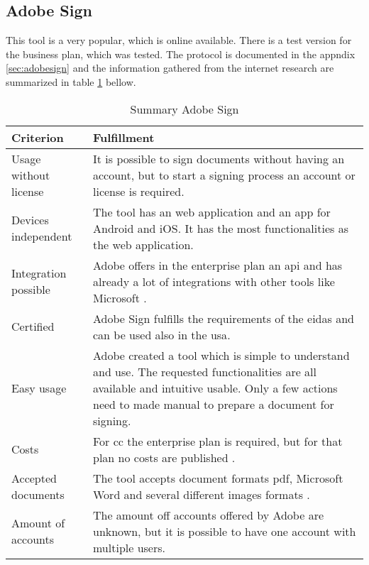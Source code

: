 \subsection{Adobe Sign}
This tool is a very popular, which is online available. There is a test version for the business plan, which was tested. The protocol is documented in the appndix \ref{sec:adobesign} and the information gathered from the internet research are summarized in table \ref{tab:adobesign} bellow. 
\begin{table}[h!]
	\begin{tabular}{|p{4cm}|p{10cm}|} \hline
		Criterion & Fulfillment \\ \hline
		Usage without license & It is possible to sign documents without having an account, but to start a signing process an account or license is required. \\ \hline
		Devices independent & The tool has an web application and an \gls{app} for Android and iOS. It has the most functionalities as the web application. \\ \hline
		Integration possible & Adobe offers in the enterprise plan an \gls{api} and has already a lot of integrations with other tools like Microsoft \parencite{adobesign2018integration,adobesign2018info}. \\ \hline
		Certified & Adobe Sign fulfills the requirements of the \gls{eidas} and can be used also in the \gls{usa}. \parencite{adobesign2018legal} \\ \hline
		Easy usage & Adobe created a tool which is simple to understand and use. The requested functionalities are all available and intuitive usable. Only a few actions need to made manual to prepare a document for signing.\\ \hline
		Costs & For \gls{cc} the enterprise plan is required, but for that plan no costs are published \parencite{adobesign2018costs}. \\ \hline
		Accepted documents & The tool accepts document formats \gls{pdf}, Microsoft Word and several different images formats \parencite{adobesign2018info}. \\ \hline
		Amount of accounts & The amount off accounts offered by Adobe are unknown, but it is possible to have one account with multiple users. \\ \hline
	\end{tabular}
	\caption{Summary Adobe Sign}
	\label{tab:adobesign}
\end{table}

